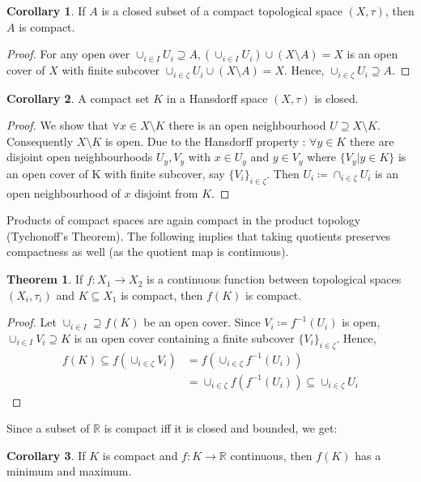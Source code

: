 \documentclass[10pt,a4paper]{article}
\theoremstyle{definition}
\theoremstyle{cor}
\newtheorem{cor}{Corollary}
\theoremstyle{theorem}
\newtheorem{theorem}{Theorem}
\theoremstyle{lemma}
\theoremstyle{example}
\theoremstyle{remark}
\begin{document}
\begin{cor}
If $A$ is a closed subset of a compact topological space $(X, \tau)$, then $A$ is compact.
\end{cor}
\begin{proof}
For any open over $\cup_{i\in I} U_i \supseteq A, (\cup_{i\in I} U_i)\cup (X\setminus A) = X$ is an open cover of $X$ with finite subcover $\cup_{i\in\zeta} U_{i} \cup (X \setminus A) = X$. Hence, $\cup_{i \in \zeta} U_i \supseteq A$.
\end{proof}

\begin{cor}
A compact set $K$ in a Hansdorff space $(X, \tau)$ is closed.
\end{cor}
\begin{proof}
We show that $\forall x\in X \setminus K$ there is an open neighbourhood $U \supseteq X \setminus K$. Consequently $X \setminus K$ is open. Due to the Hansdorff property : $\forall y \in K$ there are disjoint open neighbourhoods $U_y, V_y$ with $x \in U_y$ and $y\in V_y$ where $\{V_y | y \in K\}$ is an open cover of K with finite subcover, say $\{V_i \}_{i \in \zeta}$. Then $U_i \coloneqq \cap_{i\in\zeta} U_i$ is an open neighbourhood of $x$ disjoint from $K$.
\end{proof}
\noindent Products of compact spaces are again compact in the product topology (Tychonoff's Theorem). The following implies that taking quotients preserves compactness as well (as the quotient map is continuous).

\begin{theorem}
If $f: X_1 \rightarrow X_2 $ is a continuous function between topological spaces $(X_i, \tau_i)$ and $K \subseteq X_1$ is compact, then $f(K)$ is compact. 
\end{theorem}
\begin{proof}
Let $\cup_{i \in I} \supseteq f(K)$ be an open cover. Since $V_i \coloneqq f^{-1}(U_i)$ is open, $\cup _{i \in I} V_i \supseteq K$ is an open cover containing a finite subcover $\{ V_i\}_{i \in \zeta}$. Hence, 
\begin{align*}
f(K) \subseteq f\left(\cup_{i\in\zeta} V_i\right) &= f\left(\cup_{i\in\zeta} f^{-1}(U_i)\right) \\
&= \cup_{i\in\zeta} f\left(f^{-1}(U_i)\right) \subseteq \cup_{i\in\zeta} U_i
\end{align*} 
\end{proof}

\noindent Since a subset of $\mathbb{R}$ is compact iff it is closed and bounded, we get: 
\begin{cor}
If $K$ is compact and $f: K \rightarrow \mathbb{R}$ continuous, then $f(K)$ has a minimum and maximum.
\end{cor}
\end{document}
